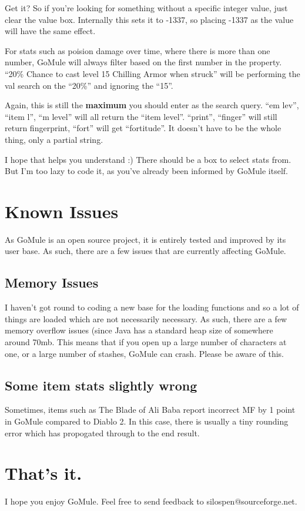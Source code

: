 \documentclass[a4paper,10pt]{article}
\begin{document}
Get it? So if you're looking for something without a specific integer value, just clear the value box. Internally this sets it to -1337, so placing -1337 as the value will have the same effect.

For stats such as poision damage over time, where there is more than one number, GoMule will always filter based on the first number in the property. ``20\% Chance to cast level 15 Chilling Armor when struck'' will be performing the val search on the ``20\%'' and ignoring the ``15''.

Again, this is still the \textbf{maximum} you should enter as the search query. ``em lev'', ``item l'', ``m level'' will all return the ``item level''. ``print'', ``finger'' will still return fingerprint, ``fort'' will get ``fortitude''. It doesn't have to be the whole thing, only a partial string.

I hope that helps you understand :) There should be a box to select stats from. But I'm too lazy to code it, as you've already been informed by GoMule itself.

\section{Known Issues}

As GoMule is an open source project, it is entirely tested and improved by its user base. As such, there are a few issues that are currently affecting GoMule.

\subsection{Memory Issues}

I haven't got round to coding a new base for the loading functions and so a lot of things are loaded which are not necessarily necessary. As such, there are a few memory overflow issues (since Java has a standard heap size of somewhere around 70mb. This means that if you open up a large number of characters at one, or a large number of stashes, GoMule can crash. Please be aware of this.

\subsection{Some item stats slightly wrong}

Sometimes, items such as The Blade of Ali Baba report incorrect MF by 1 point in GoMule compared to Diablo 2. In this case, there is usually a tiny rounding error which has propogated through to the end result.

\section{That's it.}

I hope you enjoy GoMule. Feel free to send feedback to silospen@sourceforge.net.
\end{document}
